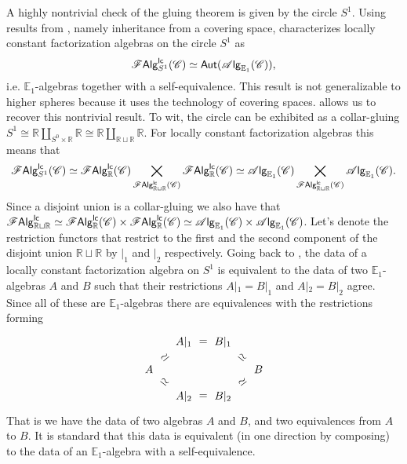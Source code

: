 \documentclass[../text]{subfiles}
\begin{document}
\begin{example}\label{ex:reproduce_lcfas_on_S1}
    A highly nontrivial check of the gluing theorem is given by the circle $S^1$. Using results from \cite[prop.4.0.1]{cg2016}, namely inheritance from a covering space, \cite[sec.5.5]{ginot2015} characterizes locally constant factorization algebras on the circle $S^1$ as
    \begin{equation}
        \mathscr{F} \mathsf{Alg}^{\mathsf{lc}}_{S^1} (\mathscr{C}) \simeq \mathsf{Aut} (\mathscr{A} \mathsf{lg}_{\mathbb{E}_1} (\mathscr{C})),
    \end{equation}
    i.e. $\mathbb{E}_1$-algebras together with a self-equivalence. This result is not generalizable to higher spheres because it uses the technology of covering spaces.  allows us to recover this nontrivial result. To wit, the circle can be exhibited as a collar-gluing $S^1 \cong \mathbb{R} \coprod_{S^0 \times \mathbb{R}} \mathbb{R} \cong \mathbb{R} \coprod_{\mathbb{R} \sqcup \mathbb{R}} \mathbb{R}$. For locally constant factorization algebras this means that
    \begin{equation}\label{eq:lcfas_on_S1_gluing}
        \mathscr{F} \mathsf{Alg}^{\mathsf{lc}}_{S^1} (\mathscr{C}) \simeq \mathscr{F} \mathsf{Alg}^{\mathsf{lc}}_{\mathbb{R}} (\mathscr{C}) \bigtimes_{\mathscr{F} \mathsf{Alg}^{\mathsf{lc}}_{\mathbb{R} \sqcup \mathbb{R}} (\mathscr{C})} \mathscr{F} \mathsf{Alg}^{\mathsf{lc}}_{\mathbb{R}} (\mathscr{C}) \simeq \mathscr{A} \mathsf{lg}_{\mathbb{E}_1} (\mathscr{C}) \bigtimes_{\mathscr{F} \mathsf{Alg}^{\mathsf{lc}}_{\mathbb{R} \sqcup \mathbb{R}} (\mathscr{C})} \mathscr{A} \mathsf{lg}_{\mathbb{E}_1} (\mathscr{C}).
    \end{equation}
    Since a disjoint union is a collar-gluing we also have that $\mathscr{F} \mathsf{Alg}^{\mathsf{lc}}_{\mathbb{R} \sqcup \mathbb{R}} \simeq \mathscr{F} \mathsf{Alg}^{\mathsf{lc}}_{\mathbb{R}} (\mathscr{C}) \times \mathscr{F} \mathsf{Alg}^{\mathsf{lc}}_{\mathbb{R}} (\mathscr{C}) \simeq \mathscr{A} \mathsf{lg}_{\mathbb{E}_1} (\mathscr{C}) \times \mathscr{A} \mathsf{lg}_{\mathbb{E}_1} (\mathscr{C})$. Let's denote the restriction functors that restrict to the first and the second component of the disjoint union $\mathbb{R} \sqcup \mathbb{R}$ by $|_1$ and $|_2$ respectively. Going back to , the data of a locally constant factorization algebra on $S^1$ is equivalent to the data of two $\mathbb{E}_1$-algebras $A$ and $B$ such that their restrictions $A|_1 = B|_1$ and $A|_2 = B|_2$ agree. Since all of these are $\mathbb{E}_1$-algebras there are equivalences with the restrictions forming
    \begin{equation}
        \begin{tikzcd}[row sep = small, column sep= small]
            & A|_1 \arrow[r, phantom, "=", description] & B|_1 & \\
            A \arrow[rd, phantom, "\simeq", sloped, description] \arrow[ru, phantom, "\simeq", sloped, description] & & & B \arrow[lu, phantom, "\simeq", sloped, description] \arrow[ld,  phantom, "\simeq", sloped, description] \\
            & A|_2 \arrow[r, phantom, "=", description] & B|_2 &                        
        \end{tikzcd}
    \end{equation}
    That is we have the data of two algebras $A$ and $B$, and two equivalences from $A$ to $B$. It is standard that this data is equivalent (in one direction by composing) to the data of an $\mathbb{E}_1$-algebra with a self-equivalence.
\end{example}
\end{document}
